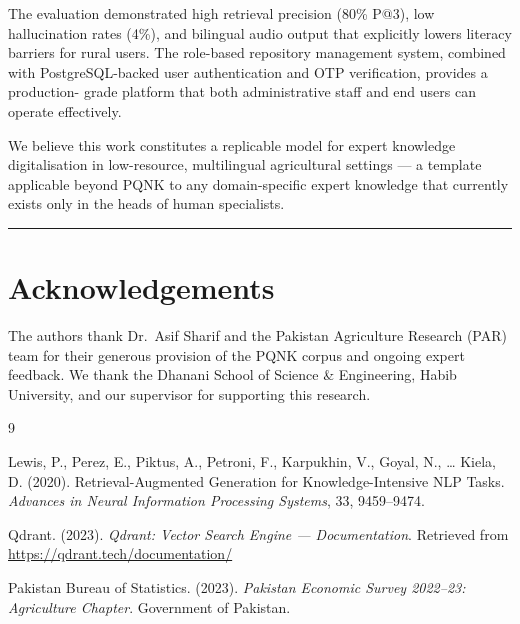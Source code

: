 \documentclass[12pt, a4paper]{article}
\begin{document}
\begin{onehalfspacing}
The evaluation demonstrated high retrieval precision (80\% P@3), low hallucination
rates (4\%), and bilingual audio output that explicitly lowers literacy barriers
for rural users. The role-based repository management system, combined with
PostgreSQL-backed user authentication and OTP verification, provides a production-
grade platform that both administrative staff and end users can operate effectively.

We believe this work constitutes a replicable model for expert knowledge
digitalisation in low-resource, multilingual agricultural settings --- a template
applicable beyond PQNK to any domain-specific expert knowledge that currently
exists only in the heads of human specialists.

\vspace{12pt}\hrule\vspace{12pt}

\section*{Acknowledgements}

The authors thank Dr.~Asif Sharif and the Pakistan Agriculture Research (PAR)
team for their generous provision of the PQNK corpus and ongoing expert feedback.
We thank the Dhanani School of Science \& Engineering, Habib University, and our
supervisor for supporting this research.

\vspace{12pt}


\begin{thebibliography}{9}

Lewis, P., Perez, E., Piktus, A., Petroni, F., Karpukhin, V., Goyal, N., \ldots
Kiela, D. (2020).
\newblock Retrieval-Augmented Generation for Knowledge-Intensive NLP Tasks.
\newblock \textit{Advances in Neural Information Processing Systems}, 33, 9459--9474.

Qdrant. (2023).
\newblock \textit{Qdrant: Vector Search Engine --- Documentation}.
\newblock Retrieved from \url{https://qdrant.tech/documentation/}

Pakistan Bureau of Statistics. (2023).
\newblock \textit{Pakistan Economic Survey 2022--23: Agriculture Chapter}.
\newblock Government of Pakistan.


\end{thebibliography}
\end{onehalfspacing}
\end{document}
